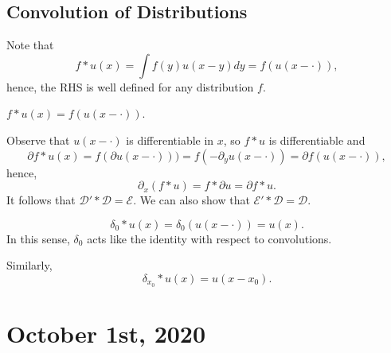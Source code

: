 \documentclass[12pt]{scrartcl}
\begin{document}
\subsection{Convolution of Distributions}
Note that 
$$f*u(x) = \int f(y)u(x-y) dy = f(u(x- \cdot)),$$
hence, the RHS is well defined for any distribution $f$. 
\begin{definition} $f * u(x) = f(u(x - \cdot)).$
\end{definition}
Observe that $u(x-\cdot )$ is differentiable in $x$, so $f*u$ is differentiable and $$\partial f*u(x) = f(\partial u(x-\cdot))) = f(-\partial_y u(x-\cdot)) = \partial f(u(x- \cdot)),$$
hence,
  $$\partial_x(f * u) = f * \partial u = \partial f * u.$$
It follows that $\mathcal D' * \mathcal D = \mathcal E$.  We can also show that $\mathcal E' * \mathcal D = \mathcal D$.
\begin{example} $$\delta_0 * u(x) = \delta_0(u(x- \cdot)) = u(x).$$  In this sense, $\delta_0$ acts like the identity with respect to convolutions.

Similarly,
$$\delta_{x_0}*u(x) = u(x-x_0).$$
\end{example}
\pagebreak
\section{October 1st, 2020}
\end{document}

